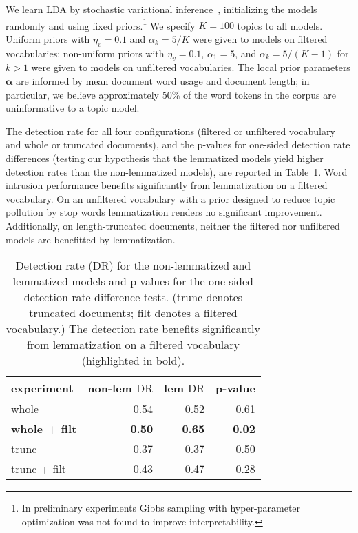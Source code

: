 \documentclass[11pt,letterpaper]{article}
\renewcommand{\vec}{\boldsymbol}   %
\newcommand{\valpha}{{\vec{\alpha}}}
\newcommand{\DR}{\ensuremath{\textrm{DR}}}
\begin{document}
{We learn LDA by stochastic variational
inference~\cite{hoffman2013}, initializing the models randomly and
using fixed priors.\footnote{
    In preliminary experiments Gibbs
    sampling with hyper-parameter optimization was not found to improve
    interpretability.
}
We specify $K = 100$ topics to all models.
Uniform priors with $\eta_v = 0.1$ and
$\alpha_k = 5 / K$ were given to models on
filtered vocabularies; non-uniform priors with
$\eta_v = 0.1$, $\alpha_1 = 5$, and $\alpha_k = 5 / (K-1)$
for $k > 1$
were given to models on unfiltered vocabularies.
The local prior parameters $\valpha$ are informed by mean
document word usage and document length; in particular, we
believe approximately 50\% of the word tokens in the corpus are
uninformative to a topic model.

The detection rate for all four configurations (filtered or unfiltered
vocabulary and whole or truncated documents), and the
p-values for one-sided detection rate differences (testing our
hypothesis that the lemmatized models yield higher detection rates than
the non-lemmatized models), are reported in
Table~\ref{tab:detection-rate}.  Word intrusion performance benefits
significantly from lemmatization on a filtered vocabulary.  On an
unfiltered vocabulary with a prior designed to reduce topic pollution
by stop words lemmatization renders no significant improvement.
Additionally, on length-truncated documents, neither the filtered nor
unfiltered models are benefitted by lemmatization.

\begin{table}
    \begin{tabular}{l|rr|r}
        experiment            & non-lem $\DR$ &     lem $\DR$ &       p-value \\\hline
        whole                 &          0.54 &          0.52 &          0.61 \\
        \textbf{whole + filt} & \textbf{0.50} & \textbf{0.65} & \textbf{0.02} \\
        trunc                 &          0.37 &          0.37 &          0.50 \\
        trunc + filt          &          0.43 &          0.47 &          0.28 \\
    \end{tabular}
    \caption{Detection rate ($\DR$) for the non-lemmatized and
        lemmatized models
        and p-values for the one-sided detection rate difference tests.
        (trunc denotes truncated documents; filt denotes a filtered
        vocabulary.)
        The detection rate benefits significantly from lemmatization on
        a filtered vocabulary (highlighted in bold).}
    \label{tab:detection-rate}
\end{table}

}
\end{document}
